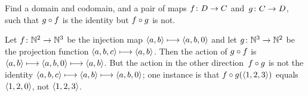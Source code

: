 \documentclass{test}  %
\begin{document}
\begin{problem}
\end{problem}

\begin{problem}
  Find a domain and codomain, and a pair of maps $\mbox{$f\colon D\to C$}$ 
  and~$\mbox{$g\colon C\to D$}$,
  such that $g\mathbin{\circ} f$ is the identity but $f\mathbin{\circ} g$
  is not.
\begin{answer}
Let $\mbox{$f\colon \mathbb{N}^2\to \mathbb{N}^3$}$ be the injection map
$\langle a,b\rangle\stackrel{}{\longmapsto}\langle a,b,0\rangle$
and let 
$\mbox{$g\colon \mathbb{N}^3\to \mathbb{N}^2$}$ be the projection function
$\langle a,b,c\rangle\stackrel{}{\longmapsto}\langle a,b\rangle$.
Then the action of $g\mathbin{\circ} f$ is 
$\langle a,b\rangle\stackrel{}{\longmapsto}\langle a,b,0\rangle\stackrel{}{\longmapsto}\langle a,b\rangle$.
But the action in the other direction~$f\mathbin{\circ} g$ is not the identity
$\langle a,b,c\rangle\stackrel{}{\longmapsto}\langle a,b\rangle\stackrel{}{\longmapsto}\langle a,b,0\rangle$;
one instance is that $f\mathbin{\circ} g(\langle1,2,3\rangle)$ equals
$\langle1,2,0\rangle$, not $\langle1,2,3\rangle$.     
\end{answer}
\end{problem}
\end{document}
